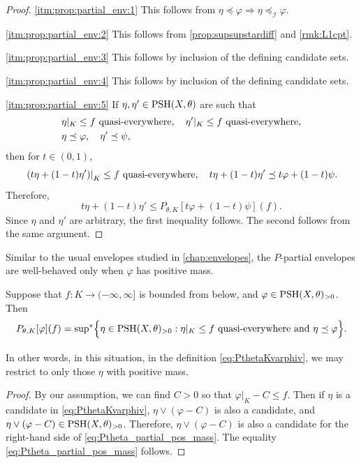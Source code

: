 \begin{proof}
    \ref{itm:prop:partial_env:1} This follows from $\eta\preceq \varphi\Rightarrow \eta\preceq_{\mathcal I}\varphi$.

    \ref{itm:prop:partial_env:2} This follows from \cref{prop:supsupstardiff} and \cref{rmk:L1cpt}.

    \ref{itm:prop:partial_env:3} This follows by inclusion of the defining candidate sets.

    \ref{itm:prop:partial_env:4} This follows by inclusion of the defining candidate sets.

    \ref{itm:prop:partial_env:5} If $\eta,\eta'\in \mathrm{PSH}(X,\theta)$ are such that
    \[
    \begin{split}
        &\eta|_K\leq f\textup{ quasi-everywhere},\quad \eta'|_K\leq f\textup{ quasi-everywhere},\\
        &\eta\preceq \varphi,\quad \eta'\preceq \psi,
    \end{split}
    \]
    then for $t\in (0,1)$,
    \[
        \left.\left(t\eta+(1-t)\eta'\right)\right|_K\leq f\textup{ quasi-everywhere},\quad t\eta+(1-t)\eta' \preceq t\varphi+(1-t)\psi.
    \]
    Therefore,
    \[
    t\eta+(1-t)\eta'\leq P_{\theta,K}\left[t\varphi+(1-t)\psi\right](f).
    \]
    Since $\eta$ and $\eta'$ are arbitrary, the first inequality follows. The second follows from the same argument.
\end{proof}

Similar to the usual envelopes studied in \cref{chap:envelopes}, the $P$-partial envelopes are well-behaved only when $\varphi$ has positive mass.

\begin{lemma}\label{lma:pos_mass_partial}
    Suppose that $f\colon K\rightarrow (-\infty,\infty]$ is bounded from below, and $\varphi\in \mathrm{PSH}(X,\theta)_{>0}$. Then
    \begin{equation}\label{eq:Ptheta_partial_pos_mass}
    P_{\theta,K}[\varphi](f)= \operatorname*{sup}_{}{}\!{}^{*} \Bigl\{ \eta \in \mathrm{PSH}(X,\theta)_{>0}: \eta|_K \leq f  \textup{ quasi-everywhere and } \eta\preceq \varphi\Bigr\}.
    \end{equation}
\end{lemma}
In other words, in this situation, in the definition \eqref{eq:PthetaKvarphiv}, we may restrict to only those $\eta$ with positive mass.
\begin{proof}
    By our assumption, we can find $C>0$ so that $\varphi|_K-C\leq f$. Then if $\eta$ is a candidate in \eqref{eq:PthetaKvarphiv}, $\eta\lor (\varphi-C)$ is also a candidate, and $\eta\lor (\varphi-C)\in \mathrm{PSH}(X,\theta)_{>0}$. Therefore, $\eta\lor (\varphi-C)$ is also a candidate for the right-hand side of \eqref{eq:Ptheta_partial_pos_mass}. The equality \eqref{eq:Ptheta_partial_pos_mass} follows.
\end{proof}

